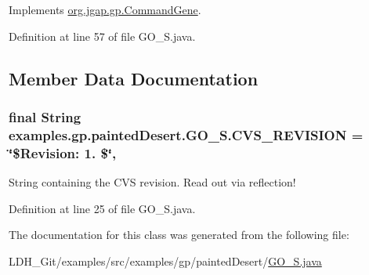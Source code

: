 Implements \hyperlink{classorg_1_1jgap_1_1gp_1_1_command_gene_a236141d99059da808afe7a9217e411c7}{org.\-jgap.\-gp.\-Command\-Gene}.



Definition at line 57 of file G\-O\-\_\-\-S.\-java.



\subsection{Member Data Documentation}
\hypertarget{classexamples_1_1gp_1_1painted_desert_1_1_g_o___s_a0eed133f3cef1e71eefa26a9ff5ef475}{
\subsubsection[{C\-V\-S\-\_\-\-R\-E\-V\-I\-S\-I\-O\-N}]{\setlength{\rightskip}{0pt plus 5cm}final String examples.\-gp.\-painted\-Desert.\-G\-O\-\_\-\-S.\-C\-V\-S\-\_\-\-R\-E\-V\-I\-S\-I\-O\-N = \char`\"{}\$Revision\-: 1. \$\char`\"{}\hspace{0.3cm}{\ttfamily [static]}, {\ttfamily [private]}}}\label{classexamples_1_1gp_1_1painted_desert_1_1_g_o___s_a0eed133f3cef1e71eefa26a9ff5ef475}
String containing the C\-V\-S revision. Read out via reflection! 

Definition at line 25 of file G\-O\-\_\-\-S.\-java.



The documentation for this class was generated from the following file\-:\begin{DoxyCompactItemize}
\item 
L\-D\-H\-\_\-\-Git/examples/src/examples/gp/painted\-Desert/\hyperlink{_g_o___s_8java}{G\-O\-\_\-\-S.\-java}\end{DoxyCompactItemize}
